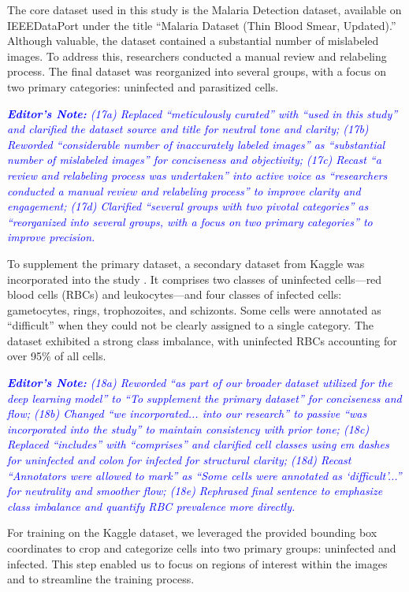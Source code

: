 \documentclass[journal,12pt,onecolumn,draftcls]{IEEEtran}
\newcommand{\editornote}[1]{\par\textit{\textcolor{blue}{\textbf{Editor's Note:} #1}}\par}
\begin{document}
The core dataset used in this study is the Malaria Detection dataset, available on IEEEDataPort under the title “Malaria Dataset (Thin Blood Smear, Updated).” Although valuable, the dataset contained a substantial number of mislabeled images. To address this, researchers conducted a manual review and relabeling process. The final dataset was reorganized into several groups, with a focus on two primary categories: uninfected and parasitized cells.

\editornote{(17a) Replaced “meticulously curated” with “used in this study” and clarified the dataset source and title for neutral tone and clarity; 
(17b) Reworded “considerable number of inaccurately labeled images” as “substantial number of mislabeled images” for conciseness and objectivity; 
(17c) Recast “a review and relabeling process was undertaken” into active voice as “researchers conducted a manual review and relabeling process” to improve clarity and engagement; 
(17d) Clarified “several groups with two pivotal categories” as “reorganized into several groups, with a focus on two primary categories” to improve precision.}

To supplement the primary dataset, a secondary dataset from Kaggle was incorporated into the study \cite{kaggle}. It comprises two classes of uninfected cells—red blood cells (RBCs) and leukocytes—and four classes of infected cells: gametocytes, rings, trophozoites, and schizonts. Some cells were annotated as “difficult” when they could not be clearly assigned to a single category. The dataset exhibited a strong class imbalance, with uninfected RBCs accounting for over 95\% of all cells.

\editornote{(18a) Reworded “as part of our broader dataset utilized for the deep learning model” to “To supplement the primary dataset” for conciseness and flow; 
(18b) Changed “we incorporated... into our research” to passive “was incorporated into the study” to maintain consistency with prior tone; 
(18c) Replaced “includes” with “comprises” and clarified cell classes using em dashes for uninfected and colon for infected for structural clarity; 
(18d) Recast “Annotators were allowed to mark” as “Some cells were annotated as ‘difficult’...” for neutrality and smoother flow; 
(18e) Rephrased final sentence to emphasize class imbalance and quantify RBC prevalence more directly.}

For training on the Kaggle dataset, we leveraged the provided bounding box coordinates to crop and categorize cells into two primary groups: uninfected and infected. This step enabled us to focus on regions of interest within the images and to streamline the training process.
\end{document}
